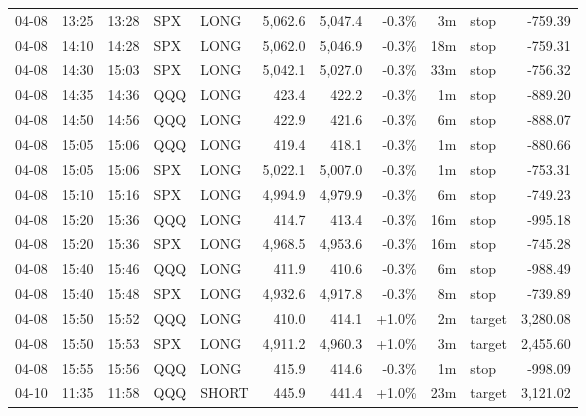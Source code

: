 \documentclass[11pt,a4paper,twoside]{article}
\begin{document}
\begin{center}
\begin{longtable}{>{\color{txtmain}}l l l l l r r r r >{\color{txtmain}}l r}
04-08 & 13:25 & 13:28 & SPX & LONG & 5,062.6 & 5,047.4 & \textcolor{lossred}{-0.3\%} & 3m & stop & \textcolor{lossred}{-759.39} \\
04-08 & 14:10 & 14:28 & SPX & LONG & 5,062.0 & 5,046.9 & \textcolor{lossred}{-0.3\%} & 18m & stop & \textcolor{lossred}{-759.31} \\
04-08 & 14:30 & 15:03 & SPX & LONG & 5,042.1 & 5,027.0 & \textcolor{lossred}{-0.3\%} & 33m & stop & \textcolor{lossred}{-756.32} \\
04-08 & 14:35 & 14:36 & QQQ & LONG & 423.4 & 422.2 & \textcolor{lossred}{-0.3\%} & 1m & stop & \textcolor{lossred}{-889.20} \\
04-08 & 14:50 & 14:56 & QQQ & LONG & 422.9 & 421.6 & \textcolor{lossred}{-0.3\%} & 6m & stop & \textcolor{lossred}{-888.07} \\
04-08 & 15:05 & 15:06 & QQQ & LONG & 419.4 & 418.1 & \textcolor{lossred}{-0.3\%} & 1m & stop & \textcolor{lossred}{-880.66} \\
04-08 & 15:05 & 15:06 & SPX & LONG & 5,022.1 & 5,007.0 & \textcolor{lossred}{-0.3\%} & 1m & stop & \textcolor{lossred}{-753.31} \\
04-08 & 15:10 & 15:16 & SPX & LONG & 4,994.9 & 4,979.9 & \textcolor{lossred}{-0.3\%} & 6m & stop & \textcolor{lossred}{-749.23} \\
04-08 & 15:20 & 15:36 & QQQ & LONG & 414.7 & 413.4 & \textcolor{lossred}{-0.3\%} & 16m & stop & \textcolor{lossred}{-995.18} \\
04-08 & 15:20 & 15:36 & SPX & LONG & 4,968.5 & 4,953.6 & \textcolor{lossred}{-0.3\%} & 16m & stop & \textcolor{lossred}{-745.28} \\
04-08 & 15:40 & 15:46 & QQQ & LONG & 411.9 & 410.6 & \textcolor{lossred}{-0.3\%} & 6m & stop & \textcolor{lossred}{-988.49} \\
04-08 & 15:40 & 15:48 & SPX & LONG & 4,932.6 & 4,917.8 & \textcolor{lossred}{-0.3\%} & 8m & stop & \textcolor{lossred}{-739.89} \\
04-08 & 15:50 & 15:52 & QQQ & LONG & 410.0 & 414.1 & \textcolor{wingreen}{+1.0\%} & 2m & target & \textcolor{wingreen}{3,280.08} \\
04-08 & 15:50 & 15:53 & SPX & LONG & 4,911.2 & 4,960.3 & \textcolor{wingreen}{+1.0\%} & 3m & target & \textcolor{wingreen}{2,455.60} \\
04-08 & 15:55 & 15:56 & QQQ & LONG & 415.9 & 414.6 & \textcolor{lossred}{-0.3\%} & 1m & stop & \textcolor{lossred}{-998.09} \\
04-10 & 11:35 & 11:58 & QQQ & SHORT & 445.9 & 441.4 & \textcolor{wingreen}{+1.0\%} & 23m & target & \textcolor{wingreen}{3,121.02} \\

\end{longtable}
\end{center}
\end{document}
